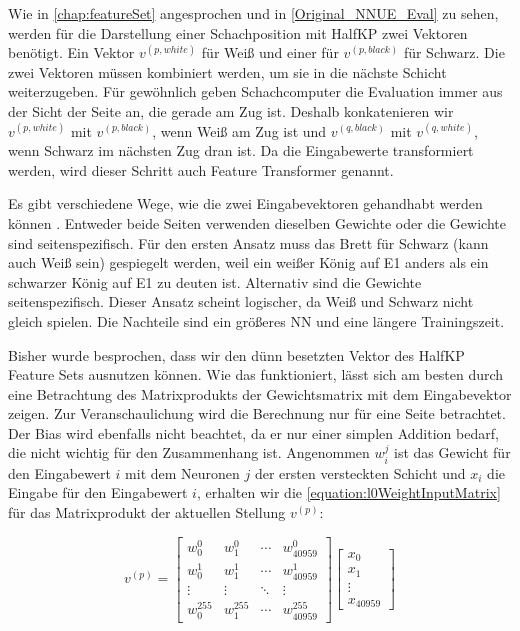 Wie in \autoref{chap:featureSet} angesprochen und in \autoref{Original_NNUE_Eval} zu sehen, werden für die Darstellung einer Schachposition mit HalfKP zwei Vektoren benötigt. Ein Vektor $v^{(p,white)}$ für Weiß und einer für $v^{(p,black)}$ für Schwarz. Die zwei Vektoren müssen kombiniert werden, um sie in die nächste Schicht weiterzugeben. Für gewöhnlich geben Schachcomputer die Evaluation immer aus der Sicht der Seite an, die gerade am Zug ist. Deshalb konkatenieren wir $v^{(p,white)}$ mit $v^{(p,black)}$, wenn Weiß am Zug ist und $v^{(q,black)}$ mit $v^{(q,white)}$, wenn Schwarz im nächsten Zug dran ist. Da die Eingabewerte transformiert werden, wird dieser Schritt auch Feature Transformer genannt.

Es gibt verschiedene Wege, wie die zwei Eingabevektoren gehandhabt werden können \cite{StockfishNNUE}. Entweder beide Seiten verwenden dieselben Gewichte oder die Gewichte sind seitenspezifisch. Für den ersten Ansatz muss das Brett für Schwarz (kann auch Weiß sein) gespiegelt werden, weil ein weißer König auf E1 anders als ein schwarzer König auf E1 zu deuten ist. Alternativ sind die Gewichte seitenspezifisch. Dieser Ansatz scheint logischer, da Weiß und Schwarz nicht gleich spielen. Die Nachteile sind ein größeres \ac{NN} und eine längere Trainingszeit.

Bisher wurde besprochen, dass wir den dünn besetzten Vektor des HalfKP Feature Sets ausnutzen können. Wie das funktioniert, lässt sich am besten durch eine Betrachtung des Matrixprodukts der Gewichtsmatrix mit dem Eingabevektor zeigen. Zur Veranschaulichung wird die Berechnung nur für eine Seite betrachtet. Der Bias wird ebenfalls nicht beachtet, da er nur einer simplen Addition bedarf, die nicht wichtig für den Zusammenhang ist. Angenommen $w_{i}^{j}$ ist das Gewicht für den Eingabewert $i$ mit dem Neuronen $j$ der ersten versteckten Schicht und $x_{i}$ die Eingabe für den Eingabewert $i$, erhalten wir die \autoref{equation:l0WeightInputMatrix} für das Matrixprodukt der aktuellen Stellung $v^{(p)}$:

\begin{equation}
  v^{(p)}=\begin{bmatrix}
    w_{0}^{0}   & w_{1}^{0}   & \cdots & w_{40959}^{0}   \\
    w_{0}^{1}   & w_{1}^{1}   & \cdots & w_{40959}^{1}   \\
    \vdots      & \vdots      & \ddots & \vdots          \\
    w_{0}^{255} & w_{1}^{255} & \cdots & w_{40959}^{255}
  \end{bmatrix} \begin{bmatrix}
    x_{0}  \\
    x_{1}  \\
    \vdots \\
    x_{40959}
  \end{bmatrix}
  \label{equation:l0WeightInputMatrix}
\end{equation}

